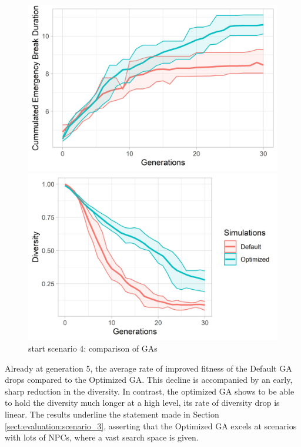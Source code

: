 \begin{figure}[ht] 
	\begin{minipage}[b]{0.5\linewidth}
		\centering
		\includegraphics[width=1\linewidth]{simulations/evaluation/plots/sim_4_ga_generations} 
	\end{minipage}%
	\begin{minipage}[b]{0.5\linewidth}
		\centering
		\includegraphics[width=1\linewidth]{simulations/evaluation/plots/sim_4_ga_diversity} 
	\end{minipage} 
	\caption{start scenario 4: comparison of GAs}
	\label{fig:evaluation:sim_4_ga_comparison}
\end{figure}

Already at generation 5, the average rate of improved fitness of the Default GA drops compared to the Optimized GA. This decline is accompanied by an early, sharp reduction in the diversity. In contrast, the optimized GA shows to be able to hold the diversity much longer at a high level, its rate of diversity drop is linear. The results underline the statement made in Section \ref{sect:evaluation:scenario_3}, asserting that the Optimized GA excels at scenarios with lots of NPCs, where a vast search space is given.



